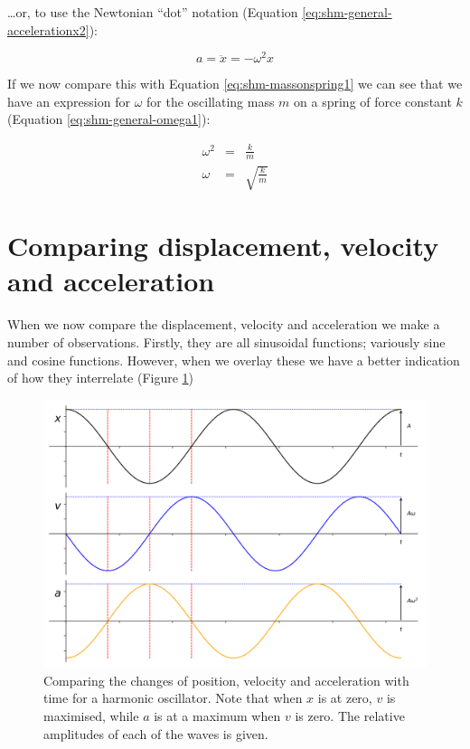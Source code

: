 \documentclass[
]{book}
\begin{document}
\ldots or, to use the Newtonian ``dot'' notation (Equation \eqref{eq:shm-general-accelerationx2}):

\begin{equation}
a = \ddot{x} = -\omega^2 x
\label{eq:shm-general-accelerationx2}
\end{equation}

If we now compare this with Equation \eqref{eq:shm-massonspring1} we can see that we have an expression for \(\omega\) for the oscillating mass \(m\) on a spring of force constant \(k\) (Equation \eqref{eq:shm-general-omega1}):

\begin{equation}
\begin{array}{rcl}
\omega^2 &=& \frac{k}{m}\\
\omega &=& \sqrt{\frac{k}{m}}
\end{array}
\label{eq:shm-general-omega1}
\end{equation}

\hypertarget{sec:shm-comparing-xva}{%
\section{Comparing displacement, velocity and acceleration}\label{sec:shm-comparing-xva}}

When we now compare the displacement, velocity and acceleration we make a number of observations. Firstly, they are all sinusoidal functions; variously sine and cosine functions. However, when we overlay these we have a better indication of how they interrelate (Figure \ref{fig:shm-general-comparison-xva})

\begin{figure}

{\centering \includegraphics[width=0.7\linewidth]{visualisations/ch1-xvacomp} 

}

\caption{Comparing the changes of position, velocity and acceleration with time for a harmonic oscillator. Note that when $x$ is at zero, $v$ is maximised, while $a$ is at a maximum when $v$ is zero. The relative amplitudes of each of the waves is given.}\label{fig:shm-general-comparison-xva}
\end{figure}
\end{document}
